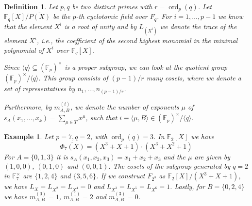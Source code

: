 \documentclass[a4paper]{article}
\newcommand{\Z}{\ensuremath{\mathbb{Z}}}
\newcommand{\F}{\mathbb{F}}
\newcommand{\ord}{\operatorname{ord}}
\newtheorem{definition}[theorem]{Definition}
\newtheorem{example}[theorem]{Example}
\numberwithin{equation}{section}
\numberwithin{table}{section}
\numberwithin{figure}{section}
\begin{document}



\begin{definition}
    Let $p,q$ be two distinct primes with $r=\ord_p(q)$. Let $\F_q[X]/\overline{P(X)}$ be the $p$-th cyclotomic field over $F_q$. For $i=1,\ldots,p-1$ we know that the element $X^i$ is a root of unity and by $L_{(X^{i})}$ we denote the trace of the element $X^i$, i.e., the coefficient of the second highest monomial in the minimal polynomial of $X^i$ over $\F_q[X]$.
    
    Since $\langle q \rangle \subseteq (\F_p)^\times$ is a proper subgroup, we can look at the quotient group $(\F_p)^\times / \langle q \rangle$. This group consists of $(p-1)/r$ many cosets, where we denote a set of representatives by $n_1,\ldots,n_{(p-1)/r}$.
    
    Furthermore, by $m_{A,B}^{(i)}$, we denote the number of exponents $\mu$ of $s_A(x_1,\ldots,x_k)=\sum_{\mu \in T}x^\mu$, such that $i \equiv \langle \mu, B \rangle \in (\F_p)^\times / \langle q \rangle$.
\end{definition}
\begin{example}
    Let $p=7,q=2$, with $\ord_p(q)=3$. In $\F_2[X]$ we have
    \[
    \overline{\Phi_7(X)}=(X^3+X+1) \cdot (X^3+X^2+1)
    \]
    For $A=\{0,1,3\}$ it is $s_A(x_1,x_2,x_3)=x_1+x_2+x_3$ and the $\mu$ are given by $(1,0,0)$, $(0,1,0)$ and $(0,0,1)$. The cosets of the subgroup generated by $q=2$ in $\F_7^\times$ are $\{1,2,4\}$ and $\{3,5,6\}$. If we construct $F_{2^3}$ as $\F_2[X]/(X^3+X+1)$, we have $L_{X}=L_{X^2}=L_{X^4}=0$ and $L_{X^3}=L_{X^5}=L_{X^6}=1$. Lastly, for $B=\{0,2,4\}$ we have $m^{(0)}_{A,B}=1$, $m^{(1)}_{A,B}=2$ and $m^{(3)}_{A,B}=0$.
\end{example}
\end{document}
